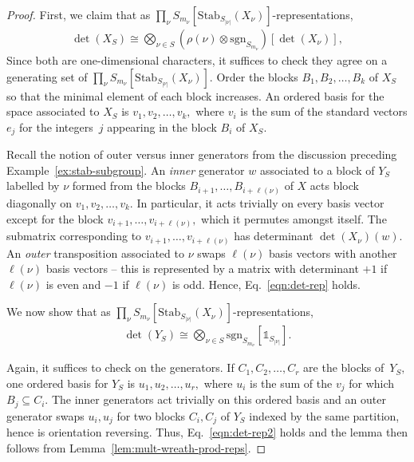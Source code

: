\documentclass[ALCO, Unicode]{cedram}
\def\stab{\mathrm{Stab}}
\def\sgn{\mathrm{sgn}}
\begin{document}
\begin{proof}
First, we claim that as $\prod_{\nu}S_{m_\nu}\left[\stab_{S_{|\nu|}}\left(X_\nu\right)\right]$-representations, 
\begin{align}\label{eqn:det-rep}
    \det(X_S) \cong \bigotimes_{\nu \in S}\left(\rho(\nu) \otimes \sgn_{S_{m_\nu}}\right) \left[\det\left(X_\nu\right)\right],
\end{align}
Since both are one-dimensional characters, it suffices to check they agree on a generating set of $\prod_{\nu}S_{m_\nu}\left[\stab_{S_{|\nu|}}\left(X_\nu\right)\right].$ Order the blocks $B_1, B_2, \ldots, B_{k}$ of $X_S$ so that the minimal element of each block increases. An ordered basis for the space associated to $X_{S}$ is $v_1, v_2, \ldots, v_k,$
where $v_i$ is the sum of the standard vectors $e_j$ for the integers~$j$ appearing in the block $B_i$ of $X_S.$ 

Recall the notion of outer versus inner generators from the discussion preceding Example~\ref{ex:stab-subgroup}. An \textit{inner} generator $w$ associated to a block of $Y_S$ labelled by $\nu$ formed from the blocks  $B_{i + 1}, \ldots, B_{i + \ell(\nu)}$ of $X$ acts block diagonally on $v_1, v_2, \ldots, v_k$. In particular, it acts trivially on every basis vector except for the block $v_{i + 1}, \ldots, v_{i + \ell(\nu)},$ which it permutes amongst itself. The submatrix corresponding to $v_{i + 1}, \ldots, v_{i + \ell(\nu)}$ has determinant $\det(X_\nu)(w).$ An \textit{outer} transposition associated to $\nu$ swaps $\ell(\nu)$ basis vectors with another $\ell(\nu)$ basis vectors -- this is represented by a matrix with determinant $+1$ if $\ell(\nu)$ is even and $-1$ if $\ell(\nu)$ is odd. Hence, Eq.~\eqref{eqn:det-rep} holds.

We now show that as $\prod_{\nu}S_{m_\nu}\left[\stab_{S_{|\nu|}}\left(X_\nu\right)\right]$-representations, 
\begin{align}\label{eqn:det-rep2}
    \det(Y_S) \cong \bigotimes_{\nu \in S}\sgn_{S_{m_\nu}}\left[\mathbb{1}_{S_{|\nu|}}\right].
\end{align}

Again, it suffices to check on the generators. If $C_1, C_2, \ldots, C_r$ are the blocks of~$Y_S,$ one ordered basis for $Y_S$ is $u_1, u_2, \ldots, u_r,$ where $u_i$ is the sum of the $v_j$ for which $B_j \subseteq C_i.$ The inner generators act trivially on this ordered basis and an outer generator swaps $u_i, u_j$ for two blocks $C_i, C_j$ of $Y_S$ indexed by the same partition, hence is orientation reversing. Thus, Eq.~\eqref{eqn:det-rep2} holds and the lemma then follows from Lemma~\ref{lem:mult-wreath-prod-reps}.
\end{proof}
\end{document}
